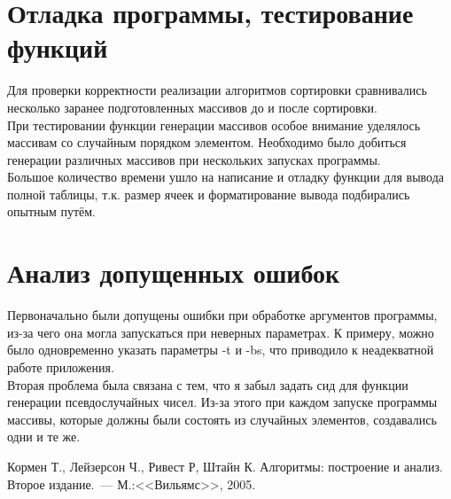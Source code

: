 \documentclass[a4paper,12pt,titlepage,finall]{article}
\begin{document}
\newpage

\section{Отладка программы, тестирование функций}

Для проверки корректности реализации алгоритмов сортировки сравнивались несколько заранее подготовленных массивов до и после сортировки.\\

При тестировании функции генерации массивов особое внимание уделялось массивам со случайным порядком элементом. Необходимо было добиться генерации различных массивов при нескольких запусках программы.\\

Большое количество времени ушло на написание и отладку функции для вывода полной таблицы, т.к. размер ячеек и форматирование вывода подбирались опытным путём.

\newpage

\section{Анализ допущенных ошибок}

Первоначально были допущены ошибки при обработке аргументов программы, из-за чего она могла запускаться при неверных параметрах. К примеру, можно было одновременно указать параметры -t и -bs, что приводило к неадекватной работе приложения.\\

Вторая проблема была связана с тем, что я забыл задать сид для функции генерации псевдослучайных чисел. Из-за этого при каждом запуске программы массивы, которые должны были состоять из случайных элементов, создавались одни и те же.

\newpage

\begin{raggedright}
\begin{thebibliography}{99}
 Кормен Т., Лейзерсон Ч., Ривест Р, Штайн К. Алгоритмы: построение и анализ. Второе издание.~--- М.:<<Вильямс>>, 2005.
\end{thebibliography}
\end{raggedright}
\end{document}
